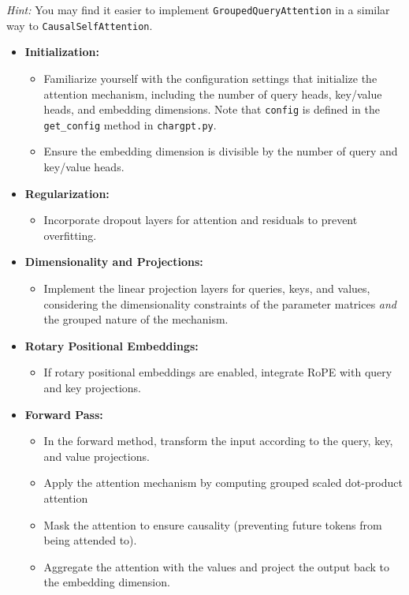 \documentclass[11pt,addpoints,answers]{exam}
\begin{document}
\begin{questions}
\begin{parts}
{    \emph{Hint:} You may find it easier to implement \lstinline{GroupedQueryAttention} in a similar way to \lstinline{CausalSelfAttention}.


    \begin{itemize}
        
    \item \textbf{ Initialization:}
    \begin{itemize}
        \item Familiarize yourself with the configuration settings that initialize the attention mechanism, including the number of query heads, key/value heads, and embedding dimensions. Note that 
        \lstinline{config} is defined in the \lstinline{get_config} method in \lstinline{chargpt.py}. 
        \item Ensure the embedding dimension is divisible by the number of query and key/value heads.
    \end{itemize}
    
    \item \textbf{Regularization:}
    \begin{itemize}
        \item Incorporate dropout layers for attention and residuals to prevent overfitting.
    \end{itemize}
    
    \item \textbf{Dimensionality and Projections:}
    \begin{itemize}
        \item Implement the linear projection layers for queries, keys, and values, considering the dimensionality constraints of the parameter matrices \textit{and} the grouped nature of the mechanism.
    \end{itemize}

    \item \textbf{Rotary Positional Embeddings:}
    \begin{itemize}
        \item If rotary positional embeddings are enabled, integrate RoPE with query and key projections. 
    \end{itemize}
    
    \item \textbf{Forward Pass:}
    \begin{itemize}
        \item In the forward method, transform the input according to the query, key, and value projections.
        \item Apply the attention mechanism by computing grouped scaled dot-product attention
        \item Mask the attention to ensure causality (preventing future tokens from being attended to).
        \item Aggregate the attention with the values and project the output back to the embedding dimension.
    \end{itemize}
    

\end{itemize}}
\end{parts}
\end{questions}
\end{document}
